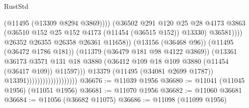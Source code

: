 \begin{lexlean}{RustStd}
\begin{coremodule}
                                                          (@11495 (@13309 @8294 @3869))))
                                                      (@36502
                                                        @291
                                                        @120
                                                        @25
                                                        @28
                                                        @4173
                                                        @3863
                                                        (@36510
                                                          @152
                                                          @25
                                                          @152
                                                          @4173
                                                          (@11454 (@36515 @152))
                                                          @13330)
                                                        @36581))))
                                                @26352
                                                @26355
                                                @26358
                                                @26361
                                                @11658))
                                            (@13156 (@36468 @96))
                                            (@11495 (@36472 @1786 @181))
                                            (@11379 (@36479 @181 @98 @4122 @3869))
                                            (@13361
                                              @36173
                                              @3571
                                              @131
                                              @18
                                              @3880
                                              (@36412
                                                @109
                                                @18
                                                @109
                                                @3880
                                                (@11454 (@36417 @109))
                                                @11597)))
                                          @13379
                                          (@11495 (@34081 @2699 @1787))
                                          @13391)))))))))))))))))))
@36676 := @11039 @1956
@36680 := @11041 (@11045 @1956) (@11051 @1956)
@36681 := @11070 @1956
@36682 := @11060 @36681
@36684 := @11056 (@36682 @11075)
@36686 := @11098 (@11099 @1956)

\end{coremodule}
\end{lexlean}
